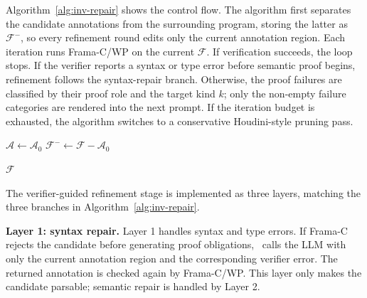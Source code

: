 \DIFaddbegin
Algorithm~\ref{alg:inv-repair} shows the control flow. The algorithm first separates the candidate annotations from the surrounding program, storing the latter as $\mathcal{F}^{-}$, so every refinement round edits only the current annotation region. Each iteration runs Frama-C/WP on the current $\mathcal{F}$. If verification succeeds, the loop stops. If the verifier reports a syntax or type error before semantic proof begins, refinement follows the syntax-repair branch. Otherwise, the proof failures are classified by their proof role and the target kind $k$; only the non-empty failure categories are rendered into the next prompt. If the iteration budget is exhausted, the algorithm switches to a conservative Houdini-style pruning pass. 
\DIFaddend
\begin{algorithm}[htbp]
\caption{Verifier-Guided Refinement $\mathrm{Refine}$}
\label{alg:inv-repair}
\small
{}

$\mathcal{A} \gets \mathcal{A}_{0}$\;
$\mathcal{F}^{-} \gets \mathcal{F} - \mathcal{A}_{0}$\;


\Return $\mathcal{F}$\;
\end{algorithm}

\DIFaddbegin
The verifier-guided refinement stage is implemented as three layers, matching the three branches in Algorithm~\ref{alg:inv-repair}.
\DIFaddend


\DIFaddbegin
\textbf{Layer 1: syntax repair.}
Layer 1 handles syntax and type errors. If Frama-C rejects the candidate before generating proof obligations, \toolname\ calls the LLM with only the current annotation region and the corresponding verifier error. The returned annotation is checked again by Frama-C/WP. This layer only makes the candidate parsable; semantic repair is handled by Layer 2.
\DIFaddend

